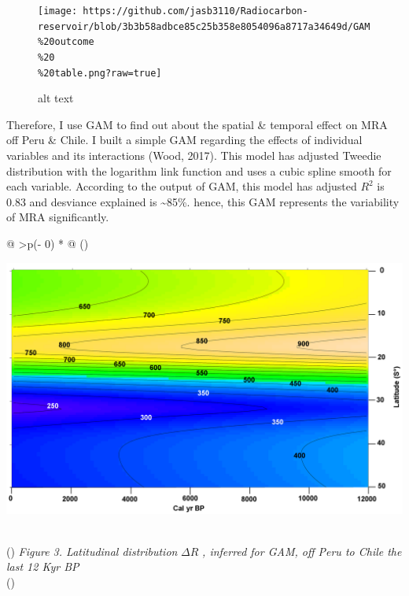 \documentclass[
]{article}
\begin{document}
\begin{figure}
\centering
\texttt{[image: https://github.com/jasb3110/Radiocarbon-reservoir/blob/3b3b58adbce85c25b358e8054096a8717a34649d/GAM\\\%20outcome\\\%20\\\%20table.png?raw=true]}
\caption{alt text}
\end{figure}

Therefore, I use GAM to find out about the spatial \& temporal effect on
MRA off Peru \& Chile. I built a simple GAM regarding the effects of
individual variables and its interactions (Wood, 2017). This model has
adjusted Tweedie distribution with the logarithm link function and uses
a cubic spline smooth for each variable. According to the output of GAM,
this model has adjusted \(R^{2}\) is 0.83 and desviance explained is
\textasciitilde85\%. hence, this GAM represents the variability of MRA
significantly.

\begin{longtable}[]{@{}
  >{\centering\arraybackslash}p{(\columnwidth - 0\tabcolsep) * }@{}}
\toprule()
\begin{minipage}[b]{\linewidth}\centering
\href{https://github.com/jasb3110/Radiocarbon-reservoir/blob/5c906b5d15b85dd72416e0abd3e72d53126c9b7b/GAM\%20radiocarbon\%20heat\%20map.png}{\includegraphics{GAM radiocarbon heat map.png}}
\end{minipage} \\
\midrule()
\endhead
\emph{Figure 3. Latitudinal distribution} \(\Delta R\) \emph{, inferred
for GAM, off Peru to Chile the last 12 Kyr BP} \\
\bottomrule()
\end{longtable}
\end{document}
